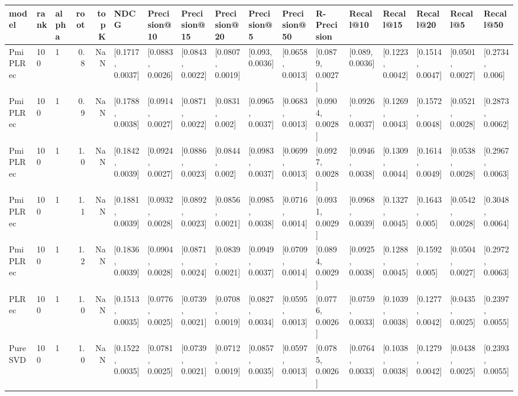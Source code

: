 \begin{tabular}{lllrrllllllllllll}
\toprule
     model & rank & alpha &  root &  topK &              NDCG &      Precision@10 &      Precision@15 &      Precision@20 &       Precision@5 &      Precision@50 &       R-Precision &         Recall@10 &         Recall@15 &         Recall@20 &          Recall@5 &         Recall@50 \\
\midrule
  PmiPLRec &  100 &     1 &   0.8 &   NaN &  [0.1717, 0.0037] &  [0.0883, 0.0026] &  [0.0843, 0.0022] &  [0.0807, 0.0019] &   [0.093, 0.0036] &  [0.0658, 0.0013] &  [0.0879, 0.0027] &   [0.089, 0.0036] &  [0.1223, 0.0042] &  [0.1514, 0.0047] &  [0.0501, 0.0027] &   [0.2734, 0.006] \\
  PmiPLRec &  100 &     1 &   0.9 &   NaN &  [0.1788, 0.0038] &  [0.0914, 0.0027] &  [0.0871, 0.0022] &   [0.0831, 0.002] &  [0.0965, 0.0037] &  [0.0683, 0.0013] &  [0.0904, 0.0028] &  [0.0926, 0.0037] &  [0.1269, 0.0043] &  [0.1572, 0.0048] &  [0.0521, 0.0028] &  [0.2873, 0.0062] \\
  PmiPLRec &  100 &     1 &   1.0 &   NaN &  [0.1842, 0.0039] &  [0.0924, 0.0027] &  [0.0886, 0.0023] &   [0.0844, 0.002] &  [0.0983, 0.0037] &  [0.0699, 0.0013] &  [0.0927, 0.0028] &  [0.0946, 0.0038] &  [0.1309, 0.0044] &  [0.1614, 0.0049] &  [0.0538, 0.0028] &  [0.2967, 0.0063] \\
  PmiPLRec &  100 &     1 &   1.1 &   NaN &  [0.1881, 0.0039] &  [0.0932, 0.0028] &  [0.0892, 0.0023] &  [0.0856, 0.0021] &  [0.0985, 0.0038] &  [0.0716, 0.0014] &  [0.0931, 0.0029] &  [0.0968, 0.0039] &  [0.1327, 0.0045] &   [0.1643, 0.005] &  [0.0542, 0.0028] &  [0.3048, 0.0064] \\
  PmiPLRec &  100 &     1 &   1.2 &   NaN &  [0.1836, 0.0039] &  [0.0904, 0.0028] &  [0.0871, 0.0024] &  [0.0839, 0.0021] &  [0.0949, 0.0037] &  [0.0709, 0.0014] &  [0.0894, 0.0029] &  [0.0925, 0.0038] &  [0.1288, 0.0045] &   [0.1592, 0.005] &  [0.0504, 0.0027] &  [0.2972, 0.0063] \\
     PLRec &  100 &     1 &   1.0 &   NaN &  [0.1513, 0.0035] &  [0.0776, 0.0025] &  [0.0739, 0.0021] &  [0.0708, 0.0019] &  [0.0827, 0.0034] &  [0.0595, 0.0013] &  [0.0776, 0.0026] &  [0.0759, 0.0033] &  [0.1039, 0.0038] &  [0.1277, 0.0042] &  [0.0435, 0.0025] &  [0.2397, 0.0055] \\
   PureSVD &  100 &     1 &   1.0 &   NaN &  [0.1522, 0.0035] &  [0.0781, 0.0025] &  [0.0739, 0.0021] &  [0.0712, 0.0019] &  [0.0857, 0.0035] &  [0.0597, 0.0013] &  [0.0785, 0.0026] &  [0.0764, 0.0033] &  [0.1038, 0.0038] &  [0.1279, 0.0042] &  [0.0438, 0.0025] &  [0.2393, 0.0055] \\

\end{tabular}
